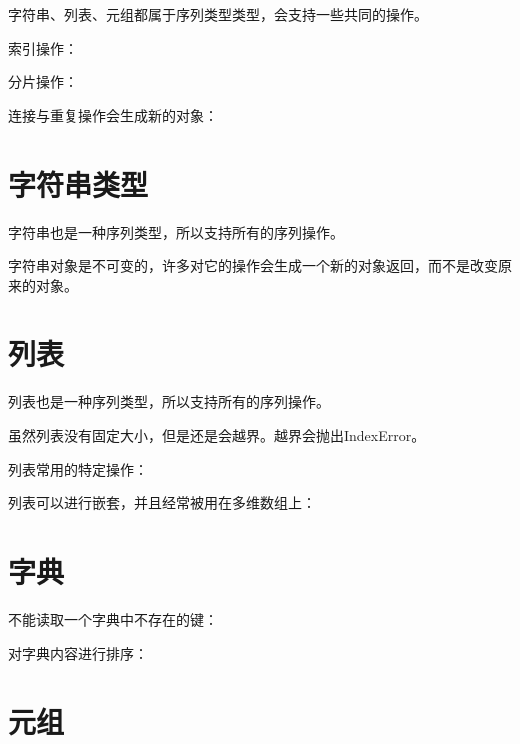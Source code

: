 		字符串、列表、元组都属于序列类型类型，会支持一些共同的操作。

		索引操作：

		

		分片操作：
		

		连接与重复操作会生成新的对象：
		

	\section{字符串类型}

		字符串也是一种序列类型，所以支持所有的序列操作。

		字符串对象是不可变的，许多对它的操作会生成一个新的对象返回，而不是改变原来的对象。

		

	\section{列表}

		列表也是一种序列类型，所以支持所有的序列操作。

		虽然列表没有固定大小，但是还是会越界。越界会抛出IndexError。
		
		列表常用的特定操作：

		

		列表可以进行嵌套，并且经常被用在多维数组上：

		

	\section{字典}

		不能读取一个字典中不存在的键：

		

		对字典内容进行排序：

		

	\section{元组}

